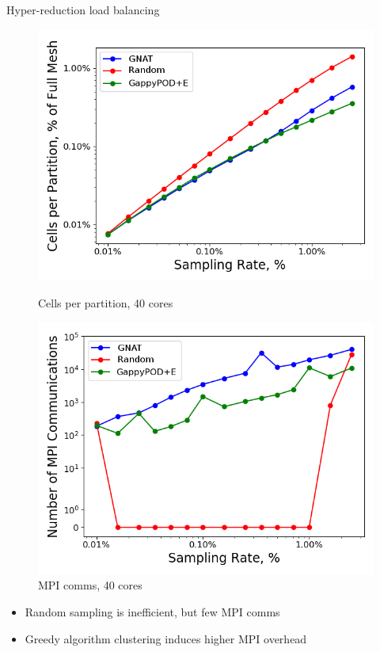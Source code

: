 \documentclass[]{beamer}
\begin{document}
\begin{frame}{Hyper-reduction load balancing}
	\begin{figure}
		\begin{minipage}{0.49\linewidth}
			\includegraphics[width=0.99\linewidth]{experiments/box/partitionSamplingTypeStudy_partition_stats_labels.png}
			\caption*{Cells per partition, 40 cores}
		\end{minipage}
		\begin{minipage}{0.49\linewidth}
			\includegraphics[width=0.99\linewidth]{experiments/box/partitionSamplingTypeStudy_partition_comms_labels.png}
			\caption*{MPI comms, 40 cores}
		\end{minipage}
	\end{figure}
	\begin{itemize}
		\item Random sampling is inefficient, but few MPI comms
		\item Greedy algorithm clustering induces higher MPI overhead
	\end{itemize}
\end{frame}
\end{document}
